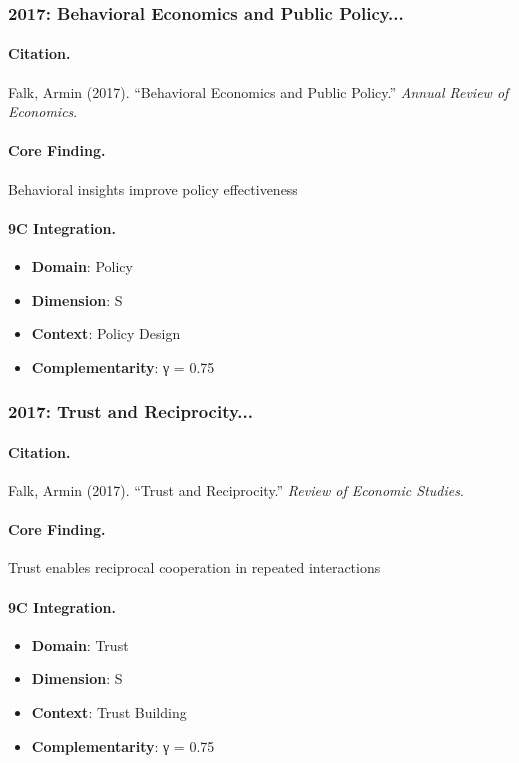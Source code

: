\subsubsection{2017: Behavioral Economics and Public Policy...}

\paragraph{Citation.}
Falk, Armin (2017). ``Behavioral Economics and Public Policy.''
\textit{Annual Review of Economics}.

\paragraph{Core Finding.}
Behavioral insights improve policy effectiveness

\paragraph{9C Integration.}
\begin{itemize}[nosep]
  \item \textbf{Domain}: Policy
  \item \textbf{Dimension}: S
  \item \textbf{Context}: Policy Design
  \item \textbf{Complementarity}: γ = 0.75
\end{itemize}


\subsubsection{2017: Trust and Reciprocity...}

\paragraph{Citation.}
Falk, Armin (2017). ``Trust and Reciprocity.''
\textit{Review of Economic Studies}.

\paragraph{Core Finding.}
Trust enables reciprocal cooperation in repeated interactions

\paragraph{9C Integration.}
\begin{itemize}[nosep]
  \item \textbf{Domain}: Trust
  \item \textbf{Dimension}: S
  \item \textbf{Context}: Trust Building
  \item \textbf{Complementarity}: γ = 0.75
\end{itemize}



